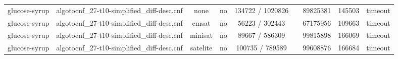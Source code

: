 \begin{appendices}
\begin{table}[p]
\begin{center}
\begin{tabular}{l|cccccccc}
  glucose-syrup                  & algotocnf\_27-t10-simplified\_diff-desc.cnf & none       & no    & 134722 / 1020826 &           & 89825381  & 145503     & timeout \\ %
  glucose-syrup                  & algotocnf\_27-t10-simplified\_diff-desc.cnf & cmsat      & no    & 56223 / 302443 &           & 67175956  & 109663     & timeout \\ %
  glucose-syrup                  & algotocnf\_27-t10-simplified\_diff-desc.cnf & minisat    & no    & 89667 / 586309 &           & 99815898  & 166069     & timeout \\ %
  glucose-syrup                  & algotocnf\_27-t10-simplified\_diff-desc.cnf & satelite   & no    & 100735 / 789589 &           & 99608876  & 166684     & timeout \\ %
    \end{tabular}
  \end{center}
\end{table}

\newpage


\end{appendices}
